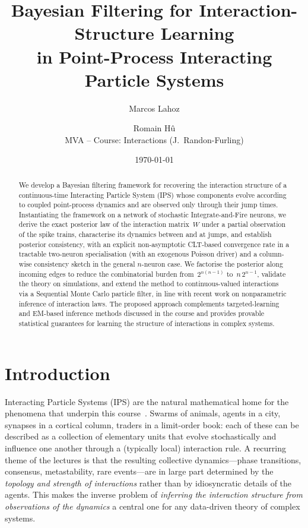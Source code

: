 \documentclass[11pt,a4paper]{article}
\title{
  \Large\bfseries
  Bayesian Filtering for Interaction-Structure Learning\\
  in Point-Process Interacting Particle Systems
}
\author{
  Marcos Lahoz \and Romain Hû\\[0.5em]
  \small MVA -- Course: Interactions (J.\ Randon-Furling)
}
\date{\today}
\theoremstyle{definition}
\begin{document}
\maketitle

\begin{abstract}
We develop a Bayesian filtering framework for recovering the interaction
structure of a continuous-time Interacting Particle System (IPS) whose
components evolve according to coupled point-process dynamics and are
observed only through their jump times. Instantiating the framework on
a network of stochastic Integrate-and-Fire neurons, we derive the
exact posterior law of the interaction matrix~$W$ under a partial
observation of the spike trains, characterise its dynamics between and
at jumps, and establish posterior consistency, with an explicit
non-asymptotic CLT-based convergence rate in a tractable two-neuron specialisation (with an exogenous Poisson driver) and
a column-wise consistency sketch in the general $n$-neuron case. We factorise the posterior
along incoming edges to reduce the combinatorial burden from~$2^{n(n-1)}$
to~$n\,2^{n-1}$, validate the theory on simulations, and extend the
method to continuous-valued interactions via a Sequential Monte Carlo
particle filter, in line with recent work on nonparametric inference
of interaction laws. The proposed approach complements
targeted-learning and EM-based inference methods discussed in the
course and provides provable statistical guarantees for learning the
structure of interactions in complex systems.
\end{abstract}

\section{Introduction}
\label{sec:intro}

Interacting Particle Systems (IPS) are the natural mathematical home for
the phenomena that underpin this course~\citep{Liggett2005,Aldous2013}.
Swarms of animals, agents in a city, synapses in a cortical column,
traders in a limit-order book: each of these can be described as a
collection of elementary units that evolve stochastically and influence
one another through a (typically local) interaction rule. A recurring
theme of the lectures is that the resulting collective dynamics---phase
transitions, consensus, metastability, rare events---are in large part
determined by the \emph{topology and strength of interactions} rather
than by idiosyncratic details of the agents. This makes the inverse
problem of \emph{inferring the interaction structure from observations
of the dynamics} a central one for any data-driven theory of complex
systems.
\end{document}
